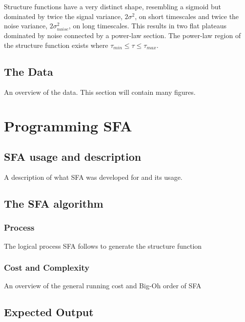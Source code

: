 \documentclass[12pt, oneside]{smuthesis}
\begin{document}
Structure functions have a very distinct shape, resembling a sigmoid but dominated by twice the signal variance, $2\sigma^{2}$, on short timescales and twice the noise variance, $2\sigma_{noise}^{2}$, on long timescales. This results in two flat plateaus dominated by noise connected by a power-law section. The power-law region of the structure function exists where $\tau_{min}\leq\tau\leq\tau_{max}$.

\section{\sc The Data} \label{theData}

An overview of the data. This section will contain many figures.

\chapter{\sc Programming SFA} \label{programmingSFA}

\section{\sc SFA usage and description} \label{usageDescription}

A description of what SFA was developed for and its usage.

\section{\sc The SFA algorithm} \label{algorithm}

\subsection{\sc Process}

The logical process SFA follows to generate the structure function

\subsection{\sc Cost and Complexity} \label{costComplexity}

An overview of the general running cost and Big-Oh order of SFA

\section{\sc Expected Output} \label{expectedOutput}
\end{document}
